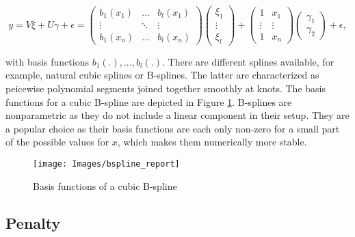\documentclass[12pt]{article}
\begin{document}
$$y = V\xi + U\gamma +\epsilon
= \begin{pmatrix}
b_1(x_1) & \dots & b_l(x_1) \\
 \vdots  & \ddots & \vdots \\
b_1(x_n) & ... & b_l(x_n)
\end{pmatrix} 
\begin{pmatrix}
\xi_1 \\
 \vdots   \\
\xi_l 
\end{pmatrix} 
+ 
\begin{pmatrix}
1 &  x_1 \\
 \vdots & \vdots \\
1 & x_n
\end{pmatrix} 
\begin{pmatrix}
\gamma_1 \\
\gamma_2 
\end{pmatrix} +\epsilon,
$$



with basis functions $b_1(.), ..., b_l(.)$. There are different splines available, for example, natural cubic splines or B-splines. The latter are characterized as peicewise polynomial segments joined together smoothly at knots. The basis functions for a cubic B-spline are depicted in Figure \ref{bsplines}. B-splines are nonparametric as they do not include a linear component in their setup. They are a popular choice as their basis functions are each only non-zero for a small part of the possible values for $x$, which makes them numerically more stable.

\begin{figure}[t]
\begin{center}
\vspace{2em}
\texttt{[image: Images/bspline\_report]}
\end{center}
\vspace{-2em}
\caption[caption]{Basis functions of a cubic B-spline}\label{bsplines}
\end{figure}


\subsection{Penalty}\label{prs}
\end{document}
